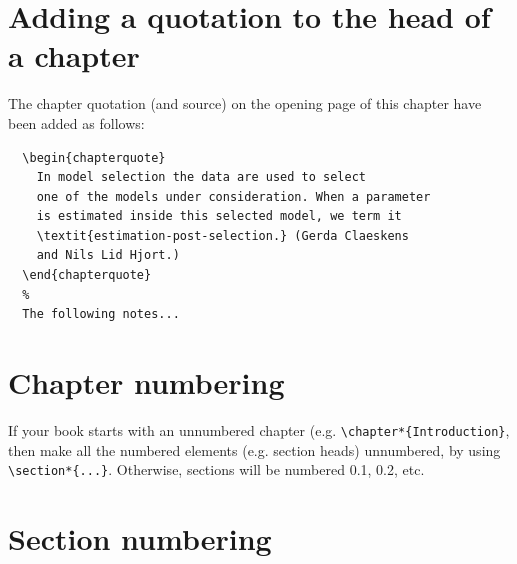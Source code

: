 

\section{Adding a quotation to the head of a chapter}
The chapter quotation (and source) on the opening page of this chapter have been added as follows:
\begin{verbatim}
  \begin{chapterquote}
    In model selection the data are used to select
    one of the models under consideration. When a parameter
    is estimated inside this selected model, we term it
    \textit{estimation-post-selection.} (Gerda Claeskens
    and Nils Lid Hjort.)
  \end{chapterquote}
  %
  The following notes...
\end{verbatim}


\section{Chapter numbering}
If your book starts with an unnumbered chapter (e.g. \verb"\chapter*{Introduction}", then make all the numbered elements (e.g. section heads) unnumbered, by using \verb"\section*{...}". Otherwise, sections will be numbered 0.1, 0.2, etc.

\section{Section numbering}

